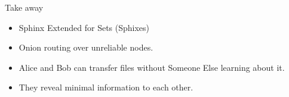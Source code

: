 \begin{frame}
  \begin{block}{Take away}
    \begin{itemize}
      \item Sphinx Extended for Sets (Sphixes)
      \item Onion routing over unreliable nodes.
      \item Alice and Bob can transfer files without Someone Else learning about 
        it.
      \item They reveal minimal information to each other.
    \end{itemize}
  \end{block}
\end{frame}



\begin{frame}[allowframebreaks]
  \printbibliography
\end{frame}

